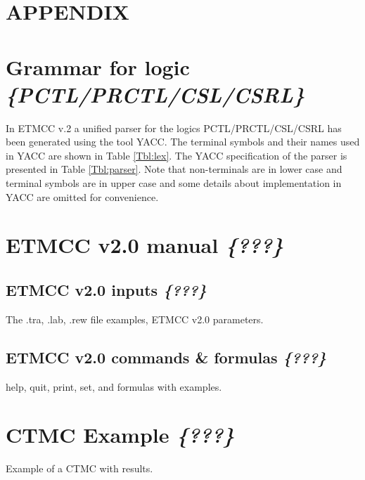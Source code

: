 \documentclass[a4paper,10pt]{article}
\begin{document}
\newpage
\appendix
  \renewcommand{\theequation}{A-\arabic{equation}}
  \setcounter{equation}{0}  %
  \section*{APPENDIX}  %

\section{Grammar for logic \textit{\{PCTL/PRCTL/CSL/CSRL\}}}
In ETMCC v.2 a unified parser for the logics PCTL/PRCTL/CSL/CSRL has been generated using the
tool YACC. The terminal symbols and their names used in YACC are shown in Table \ref{Tbl:lex}. The
YACC specification of the parser is presented in Table \ref{Tbl:parser}. Note that non-terminals are
in lower case and terminal symbols are in upper case and some details about implementation in YACC
are omitted for convenience.




\section{ETMCC v2.0 manual \textit{\{???\}}}

\subsection{ETMCC v2.0 inputs \textit{\{???\}}}
	The .tra, .lab, .rew file examples, ETMCC v2.0 parameters.

\subsection{ETMCC v2.0 commands \& formulas \textit{\{???\}}}
	help, quit, print, set, and formulas with examples.
	
\section{CTMC Example \textit{\{???\}}}
	Example of a CTMC with results.
\end{document}
